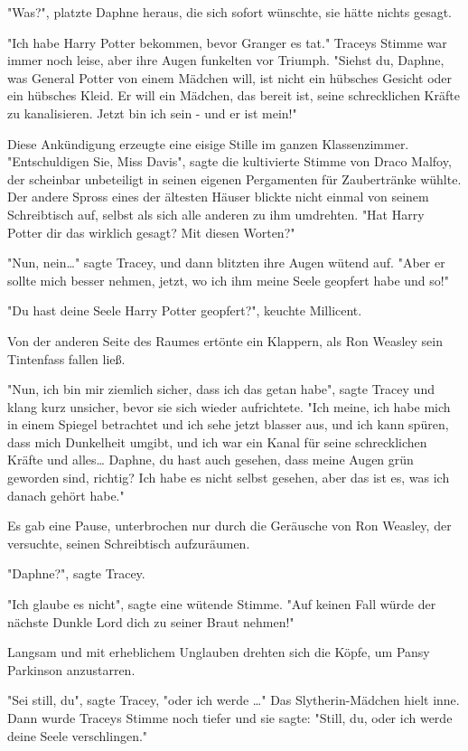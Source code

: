 {"Was?", platzte Daphne heraus, die sich sofort wünschte, sie hätte nichts gesagt.

"Ich habe Harry Potter bekommen, bevor Granger es tat." Traceys Stimme war immer noch leise, aber ihre Augen funkelten vor Triumph. "Siehst du, Daphne, was General Potter von einem Mädchen will, ist nicht ein hübsches Gesicht oder ein hübsches Kleid. Er will ein Mädchen, das bereit ist, seine schrecklichen Kräfte zu kanalisieren. Jetzt bin ich sein - und er ist mein!"

Diese Ankündigung erzeugte eine eisige Stille im ganzen Klassenzimmer. "Entschuldigen Sie, Miss Davis", sagte die kultivierte Stimme von Draco Malfoy, der scheinbar unbeteiligt in seinen eigenen Pergamenten für Zaubertränke wühlte. Der andere Spross eines der ältesten Häuser blickte nicht einmal von seinem Schreibtisch auf, selbst als sich alle anderen zu ihm umdrehten. "Hat Harry Potter dir das wirklich gesagt? Mit diesen Worten?"

"Nun, nein…" sagte Tracey, und dann blitzten ihre Augen wütend auf. "Aber er sollte mich besser nehmen, jetzt, wo ich ihm meine Seele geopfert habe und so!"

"Du hast deine Seele Harry Potter geopfert?", keuchte Millicent.

Von der anderen Seite des Raumes ertönte ein Klappern, als Ron Weasley sein Tintenfass fallen ließ.

"Nun, ich bin mir ziemlich sicher, dass ich das getan habe", sagte Tracey und klang kurz unsicher, bevor sie sich wieder aufrichtete. "Ich meine, ich habe mich in einem Spiegel betrachtet und ich sehe jetzt blasser aus, und ich kann spüren, dass mich Dunkelheit umgibt, und ich war ein Kanal für seine schrecklichen Kräfte und alles… Daphne, du hast auch gesehen, dass meine Augen grün geworden sind, richtig? Ich habe es nicht selbst gesehen, aber das ist es, was ich danach gehört habe."

Es gab eine Pause, unterbrochen nur durch die Geräusche von Ron Weasley, der versuchte, seinen Schreibtisch aufzuräumen.

"Daphne?", sagte Tracey.

"Ich glaube es nicht", sagte eine wütende Stimme. "Auf keinen Fall würde der nächste Dunkle Lord dich zu seiner Braut nehmen!"

Langsam und mit erheblichem Unglauben drehten sich die Köpfe, um Pansy Parkinson anzustarren.

"Sei still, du", sagte Tracey, "oder ich werde …" Das Slytherin-Mädchen hielt inne. Dann wurde Traceys Stimme noch tiefer und sie sagte: "Still, du, oder ich werde deine Seele verschlingen."

}
